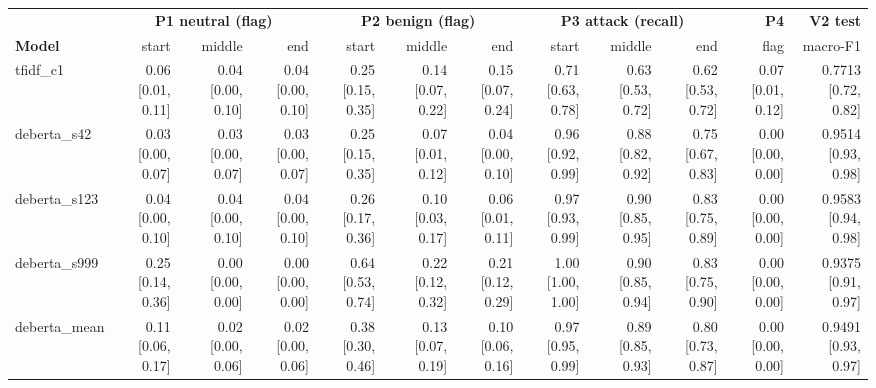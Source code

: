 \begin{tabular}{lrrrrrrrrrrr}
\toprule
 & \multicolumn{3}{c}{\textbf{P1 neutral (flag)}} & \multicolumn{3}{c}{\textbf{P2 benign (flag)}} & \multicolumn{3}{c}{\textbf{P3 attack (recall)}} & \textbf{P4} & \textbf{V2 test} \\
\textbf{Model} & start & middle & end & start & middle & end & start & middle & end & flag & macro-F1 \\
\midrule
tfidf\_c1 & 0.06 {\scriptsize[0.01, 0.11]} & 0.04 {\scriptsize[0.00, 0.10]} & 0.04 {\scriptsize[0.00, 0.10]} & 0.25 {\scriptsize[0.15, 0.35]} & 0.14 {\scriptsize[0.07, 0.22]} & 0.15 {\scriptsize[0.07, 0.24]} & 0.71 {\scriptsize[0.63, 0.78]} & 0.63 {\scriptsize[0.53, 0.72]} & 0.62 {\scriptsize[0.53, 0.72]} & 0.07 {\scriptsize[0.01, 0.12]} & 0.7713 {\scriptsize[0.72, 0.82]} \\
deberta\_s42 & 0.03 {\scriptsize[0.00, 0.07]} & 0.03 {\scriptsize[0.00, 0.07]} & 0.03 {\scriptsize[0.00, 0.07]} & 0.25 {\scriptsize[0.15, 0.35]} & 0.07 {\scriptsize[0.01, 0.12]} & 0.04 {\scriptsize[0.00, 0.10]} & 0.96 {\scriptsize[0.92, 0.99]} & 0.88 {\scriptsize[0.82, 0.92]} & 0.75 {\scriptsize[0.67, 0.83]} & 0.00 {\scriptsize[0.00, 0.00]} & 0.9514 {\scriptsize[0.93, 0.98]} \\
deberta\_s123 & 0.04 {\scriptsize[0.00, 0.10]} & 0.04 {\scriptsize[0.00, 0.10]} & 0.04 {\scriptsize[0.00, 0.10]} & 0.26 {\scriptsize[0.17, 0.36]} & 0.10 {\scriptsize[0.03, 0.17]} & 0.06 {\scriptsize[0.01, 0.11]} & 0.97 {\scriptsize[0.93, 0.99]} & 0.90 {\scriptsize[0.85, 0.95]} & 0.83 {\scriptsize[0.75, 0.89]} & 0.00 {\scriptsize[0.00, 0.00]} & 0.9583 {\scriptsize[0.94, 0.98]} \\
deberta\_s999 & 0.25 {\scriptsize[0.14, 0.36]} & 0.00 {\scriptsize[0.00, 0.00]} & 0.00 {\scriptsize[0.00, 0.00]} & 0.64 {\scriptsize[0.53, 0.74]} & 0.22 {\scriptsize[0.12, 0.32]} & 0.21 {\scriptsize[0.12, 0.29]} & 1.00 {\scriptsize[1.00, 1.00]} & 0.90 {\scriptsize[0.85, 0.94]} & 0.83 {\scriptsize[0.75, 0.90]} & 0.00 {\scriptsize[0.00, 0.00]} & 0.9375 {\scriptsize[0.91, 0.97]} \\
deberta\_mean & 0.11 {\scriptsize[0.06, 0.17]} & 0.02 {\scriptsize[0.00, 0.06]} & 0.02 {\scriptsize[0.00, 0.06]} & 0.38 {\scriptsize[0.30, 0.46]} & 0.13 {\scriptsize[0.07, 0.19]} & 0.10 {\scriptsize[0.06, 0.16]} & 0.97 {\scriptsize[0.95, 0.99]} & 0.89 {\scriptsize[0.85, 0.93]} & 0.80 {\scriptsize[0.73, 0.87]} & 0.00 {\scriptsize[0.00, 0.00]} & 0.9491 {\scriptsize[0.93, 0.97]} \\

\end{tabular}
